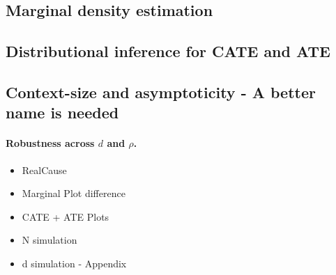 \documentclass[11pt]{article}
\begin{document}




\subsection{Marginal density estimation}
\label{sec:res-marginal}


\subsection{Distributional inference for CATE and ATE}
\label{sec:res-distributions}


\subsection{Context-size and asymptoticity - A better name is needed}
\label{sec:res-nsweep}


\paragraph{Robustness across $d$ and $\rho$.}

\begin{itemize}
    \item RealCause
    \item Marginal Plot difference
    \item CATE + ATE Plots
    \item N simulation
    \item d simulation - Appendix
\end{itemize}
\end{document}
